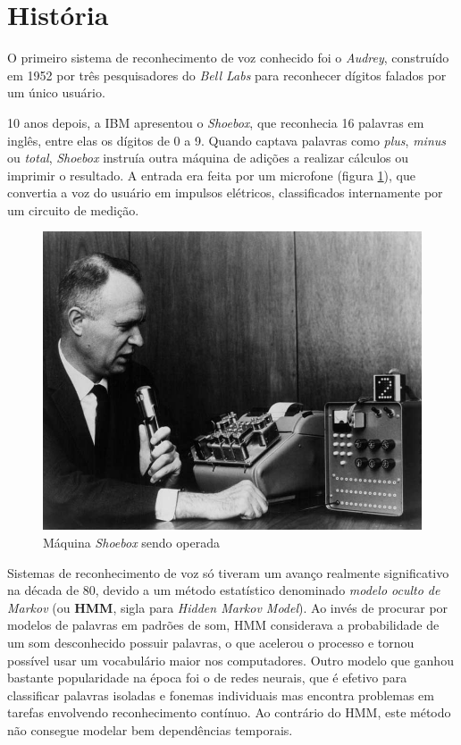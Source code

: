 
\section{História}

O primeiro sistema de reconhecimento de voz conhecido foi o \textit{Audrey}, construído em 1952 por três pesquisadores do \textit{Bell Labs} para reconhecer dígitos falados por um único usuário.

10 anos depois, a IBM apresentou o \textit{Shoebox}, que reconhecia 16 palavras em inglês, entre elas os dígitos de 0 a 9. Quando captava palavras como \textit{plus}, \textit{minus} ou \textit{total}, \textit{Shoebox} instruía outra máquina de adições a realizar cálculos ou imprimir o resultado. A entrada era feita por um microfone (figura \ref{shoebox}), que convertia a voz do usuário em impulsos elétricos, classificados internamente por um circuito de medição.


\begin{figure}[H]
  \centering
  \includegraphics[width=.5\textwidth]{image/shoebox.jpg}
  \caption{Máquina \textit{Shoebox} sendo operada}
  \label{shoebox}
\end{figure}

Sistemas de reconhecimento de voz só tiveram um avanço realmente significativo na década de 80, devido a um método estatístico denominado \emph{modelo oculto de Markov} (ou \textbf{HMM}, sigla para \textit{Hidden Markov Model}). Ao invés de procurar por modelos de palavras em padrões de som, HMM considerava a probabilidade de um som desconhecido possuir palavras, o que acelerou o processo e tornou possível usar um vocabulário maior nos computadores. Outro modelo que ganhou bastante popularidade na época foi o de redes neurais, que é efetivo para classificar palavras isoladas e fonemas individuais mas encontra problemas em tarefas envolvendo reconhecimento contínuo. Ao contrário do HMM, este método não consegue modelar bem dependências temporais.


